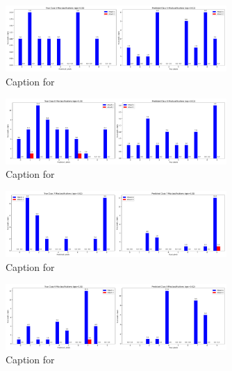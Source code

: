 \documentclass{article}
\begin{document}
\begin{figure}[!htbp]
\centering
\includegraphics[width=0.75\textwidth]{combined_class_boundary_pgd/combined_class_5_misclassifications_eps_0.02.png}
\caption{Caption for }
\label{fig:combined_class_5_misclassifications_eps_0.02.png}
\end{figure}

\begin{figure}[!htbp]
\centering
\includegraphics[width=0.75\textwidth]{combined_class_boundary_pgd/combined_class_8_misclassifications_eps_0.02.png}
\caption{Caption for }
\label{fig:combined_class_8_misclassifications_eps_0.02.png}
\end{figure}

\begin{figure}[!htbp]
\centering
\includegraphics[width=0.75\textwidth]{combined_class_boundary_pgd/combined_class_7_misclassifications_eps_0.02.png}
\caption{Caption for }
\label{fig:combined_class_7_misclassifications_eps_0.02.png}
\end{figure}



\begin{figure}[!htbp]
\centering
\includegraphics[width=0.75\textwidth]{combined_class_boundary_pgd/combined_class_9_misclassifications_eps_0.02.png}
\caption{Caption for }
\label{fig:combined_class_9_misclassifications_eps_0.02.png}
\end{figure}
\end{document}

